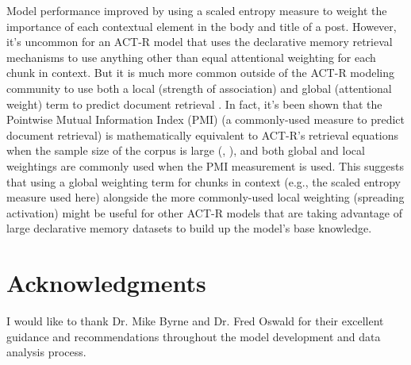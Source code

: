 \documentclass[10pt,letterpaper]{article}
\begin{document}
Model performance improved by using a scaled entropy measure to weight the importance of each contextual element in the body and title of a post.
However, it's uncommon for an ACT-R model that uses the declarative memory retrieval mechanisms to use anything other than equal attentional weighting for each chunk in context.
But it is much more common outside of the ACT-R modeling community to use both a local (strength of association) and global (attentional weight) term to predict document retrieval .
In fact, it's been shown that the Pointwise Mutual Information Index (PMI) (a commonly-used measure to predict document retrieval) is mathematically equivalent to ACT-R's retrieval equations when the sample size of the corpus is large (, ),
and both global and local weightings are commonly used when the PMI measurement is used.
This suggests that using a global weighting term for chunks in context (e.g., the scaled entropy measure used here) alongside the more commonly-used local weighting (spreading activation) might be useful for other ACT-R models that are taking advantage of large declarative memory datasets to build up the model's base knowledge.

\section{Acknowledgments}

I would like to thank Dr. Mike Byrne and Dr. Fred Oswald for their excellent guidance and recommendations throughout the model development and data analysis process.


\setlength{\bibleftmargin}{.125in}
\setlength{\bibindent}{-\bibleftmargin}

\end{document}

